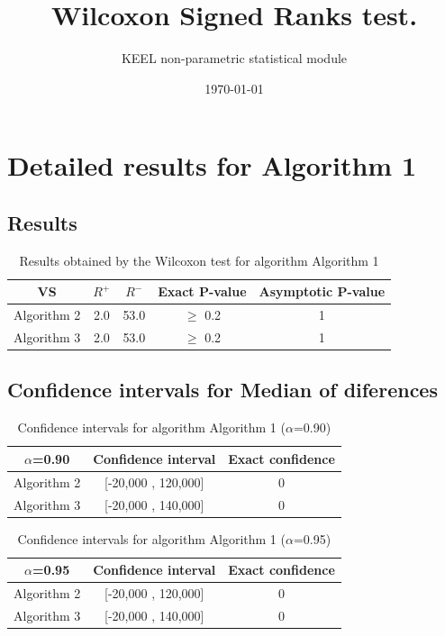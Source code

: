 \documentclass[a4paper,10pt]{article}
\title{Wilcoxon Signed Ranks test.}
\date{\today}
\author{KEEL non-parametric statistical module}
\begin{document}
\pagestyle{empty}
\maketitle
\thispagestyle{empty}



\section{Detailed results for Algorithm 1}


\subsection{Results}

\begin{table}[!htp]
\centering\small
\begin{tabular}{
|c|c|c|c|c|}
\hline
 VS & $R^{+}$ & $R^{-}$ & Exact P-value & Asymptotic P-value \\ \hline 
Algorithm 2 & 2.0 & 53.0 & $\geq$ 0.2 & 1\\ \hline 
Algorithm 3 & 2.0 & 53.0 & $\geq$ 0.2 & 1\\ \hline 

\end{tabular}
\caption{Results obtained by the Wilcoxon test for algorithm Algorithm 1}
\end{table}

\subsection{Confidence intervals for Median of diferences}

\begin{table}[!htp]
\centering\small
\begin{tabular}{
|c|c|c|}
\hline
 $\alpha$=0.90 & Confidence interval & Exact confidence \\ \hline 
Algorithm 2 & [-20,000 , 120,000] & 0\\ \hline 
Algorithm 3 & [-20,000 , 140,000] & 0\\ \hline 

\end{tabular}
\caption{Confidence intervals for algorithm Algorithm 1 ($\alpha$=0.90)}
\end{table}
\begin{table}[!htp]
\centering\small
\begin{tabular}{
|c|c|c|}
\hline
 $\alpha$=0.95 & Confidence interval & Exact confidence \\ \hline 
Algorithm 2 & [-20,000 , 120,000] & 0\\ \hline 
Algorithm 3 & [-20,000 , 140,000] & 0\\ \hline 

\end{tabular}
\caption{Confidence intervals for algorithm Algorithm 1 ($\alpha$=0.95)}
\end{table}
\end{document}
